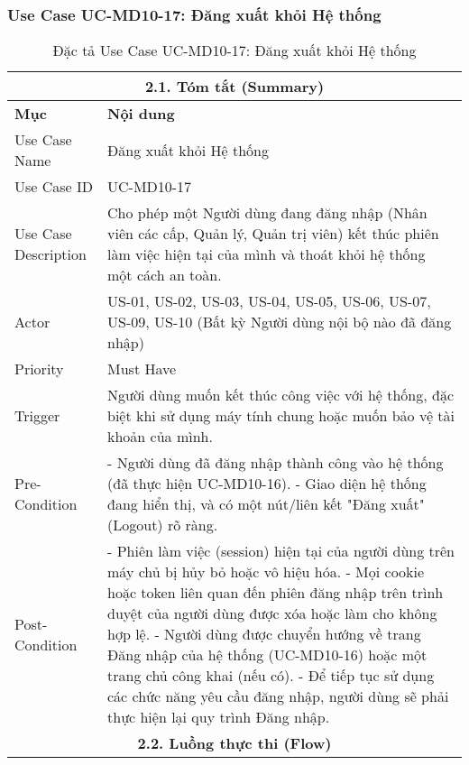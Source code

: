 \subsubsection{Use Case UC-MD10-17: Đăng xuất khỏi Hệ thống}
\begin{longtable}{|m{4cm}|p{11cm}|}
\caption{Đặc tả Use Case UC-MD10-17: Đăng xuất khỏi Hệ thống} \label{tab:uc_md10_17_logout_in_codeblock} \\
\hline
\multicolumn{2}{|c|}{\textbf{2.1. Tóm tắt (Summary)}} \\
\hline
\textbf{Mục} & \textbf{Nội dung} \\
\hline
\endhead %
\midrule
\endfoot %
\bottomrule
\endlastfoot %
Use Case Name & Đăng xuất khỏi Hệ thống \\
\hline
Use Case ID & UC-MD10-17 \\
\hline
Use Case Description & Cho phép một Người dùng đang đăng nhập (Nhân viên các cấp, Quản lý, Quản trị viên) kết thúc phiên làm việc hiện tại của mình và thoát khỏi hệ thống một cách an toàn. \\
\hline
Actor & US-01, US-02, US-03, US-04, US-05, US-06, US-07, US-09, US-10 (Bất kỳ Người dùng nội bộ nào đã đăng nhập) \\
\hline
Priority & Must Have \\
\hline
Trigger & Người dùng muốn kết thúc công việc với hệ thống, đặc biệt khi sử dụng máy tính chung hoặc muốn bảo vệ tài khoản của mình. \\
\hline
Pre-Condition & - Người dùng đã đăng nhập thành công vào hệ thống (đã thực hiện UC-MD10-16). \newline - Giao diện hệ thống đang hiển thị, và có một nút/liên kết "Đăng xuất" (Logout) rõ ràng. \\
\hline
Post-Condition & - Phiên làm việc (session) hiện tại của người dùng trên máy chủ bị hủy bỏ hoặc vô hiệu hóa. \newline - Mọi cookie hoặc token liên quan đến phiên đăng nhập trên trình duyệt của người dùng được xóa hoặc làm cho không hợp lệ. \newline - Người dùng được chuyển hướng về trang Đăng nhập của hệ thống (UC-MD10-16) hoặc một trang chủ công khai (nếu có). \newline - Để tiếp tục sử dụng các chức năng yêu cầu đăng nhập, người dùng sẽ phải thực hiện lại quy trình Đăng nhập. \\
\hline
\multicolumn{2}{|c|}{\textbf{2.2. Luồng thực thi (Flow)}} \\

\end{longtable}
